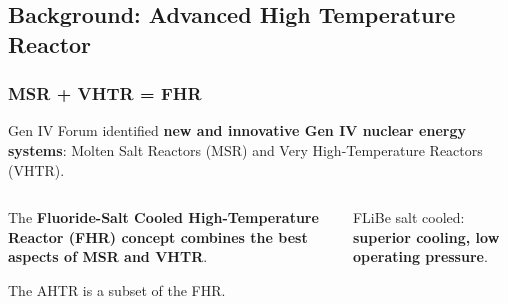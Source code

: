 \subsection{Background: Advanced High Temperature Reactor}
    \begin{frame}
        \frametitle{MSR + VHTR = FHR}
        Gen IV Forum identified \textbf{new and innovative Gen IV nuclear energy systems}: 
        Molten Salt Reactors (MSR) and Very High-Temperature Reactors (VHTR). 
        \pause
        \vspace{0.2cm}
        \begin{columns}
        \begin{column}{0.5\textwidth}
        The \textbf{Fluoride-Salt Cooled High-Temperature Reactor (FHR) concept 
        combines the best aspects of MSR and VHTR}.

        The \acrfull{AHTR} is a subset of the FHR. 
        \vspace{-0.6cm}
        \begin{figure}[]
        \end{figure}
        \end{column}
        \pause
        \begin{column}{0.5\textwidth}
            \acrfull{FLiBe} salt cooled: \textbf{superior cooling, low operating 
            pressure}. 
            

\end{column}
\end{columns}
\end{frame}
